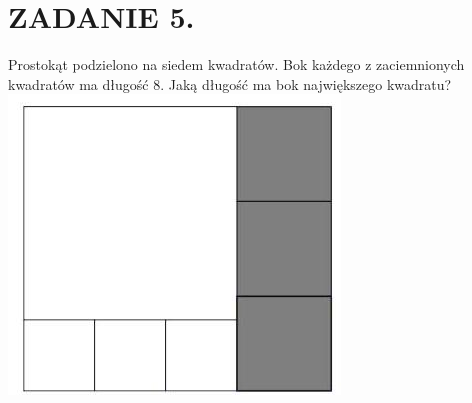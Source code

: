 \documentclass[10pt]{article}
\begin{document}
\section*{ZADANIE 5.}
Prostokąt podzielono na siedem kwadratów. Bok każdego z zaciemnionych kwadratów ma długość 8. Jaką długość ma bok największego kwadratu?\\
\includegraphics[max width=\textwidth, center]{2024_11_21_f039bcee261536a43d78g-1}
\end{document}
